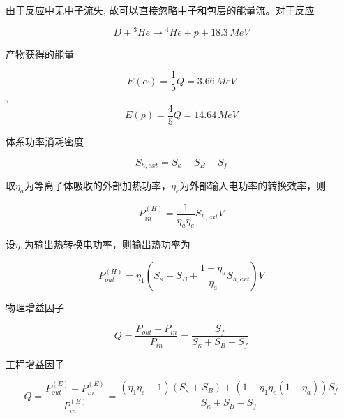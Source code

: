 \documentclass{article}
\begin{document}
由于反应中无中子流失, 故可以直接忽略中子和包层的能量流。对于反应

$$D + {}^{3}He \rightarrow {}^{4}He + p + 18.3 \, MeV$$

产物获得的能量

$$E(\alpha) = \frac{1}{5} Q = 3.66 \, MeV$$, $$E(p) = \frac{4}{5} Q = 14.64 \, MeV$$

体系功率消耗密度

$$S_{h, ext} = S_\kappa+S_B - S_f$$

取$\eta_a$为等离子体吸收的外部加热功率，$\eta_e$为外部输入电功率的转换效率，则

$$P_{in}^{(H)} = \frac{1}{\eta_a\eta_e}S_{h, ext}V$$

设$\eta_1$为输出热转换电功率，则输出热功率为

$$P_{out}^{(H)} = \eta_1(S_\kappa+S_B+\frac{1-\eta_a}{\eta_a}S_{h, ext})V$$

物理增益因子

$$Q = \frac{P_{out}-P_{in}}{P_{in}} = \frac{S_f}{S_\kappa+S_B - S_f}$$

工程增益因子

$$Q = \frac{P_{out}^{(E)}-P_{in}^{(E)}}{P_{in}^{(E)}} = \frac{(\eta_1\eta_e-1)(S_\kappa+S_B)+(1-\eta_1\eta_e(1-\eta_a))S_f}{S_\kappa+S_B - S_f}$$
\end{document}
